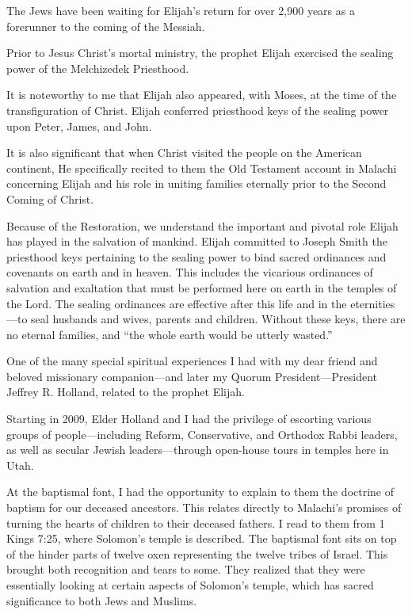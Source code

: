 \documentclass[letterpaper, 11pt]{report}
\begin{document}
The Jews have been waiting for Elijah’s return for over 2,900 years as a forerunner to the coming of the Messiah.

Prior to Jesus Christ’s mortal ministry, the prophet Elijah exercised the sealing power of the Melchizedek Priesthood.

It is noteworthy to me that Elijah also appeared, with Moses, at the time of the transfiguration of Christ. Elijah conferred priesthood keys of the sealing power upon Peter, James, and John.

It is also significant that when Christ visited the people on the American continent, He specifically recited to them the Old Testament account in Malachi concerning Elijah and his role in uniting families eternally prior to the Second Coming of Christ.

Because of the Restoration, we understand the important and pivotal role Elijah has played in the salvation of mankind. Elijah committed to Joseph Smith the priesthood keys pertaining to the sealing power to bind sacred ordinances and covenants on earth and in heaven. This includes the vicarious ordinances of salvation and exaltation that must be performed here on earth in the temples of the Lord. The sealing ordinances are effective after this life and in the eternities—to seal husbands and wives, parents and children. Without these keys, there are no eternal families, and “the whole earth would be utterly wasted.”

One of the many special spiritual experiences I had with my dear friend and beloved missionary companion—and later my Quorum President—President Jeffrey R. Holland, related to the prophet Elijah.

Starting in 2009, Elder Holland and I had the privilege of escorting various groups of people—including Reform, Conservative, and Orthodox Rabbi leaders, as well as secular Jewish leaders—through open-house tours in temples here in Utah.

At the baptismal font, I had the opportunity to explain to them the doctrine of baptism for our deceased ancestors. This relates directly to Malachi’s promises of turning the hearts of children to their deceased fathers. I read to them from 1 Kings 7:25, where Solomon’s temple is described. The baptismal font sits on top of the hinder parts of twelve oxen representing the twelve tribes of Israel. This brought both recognition and tears to some. They realized that they were essentially looking at certain aspects of Solomon’s temple, which has sacred significance to both Jews and Muslims.
\end{document}
